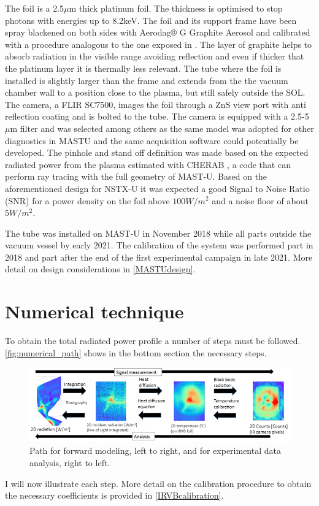 The foil is a 2.5$\mu$m thick platinum foil. The thickness is optimised to stop photons with energies up to 8.2keV. \cite{PETERSON2010} The foil and its support frame have been spray blackened on both sides with Aerodag® G Graphite Aerosol and calibrated with a procedure analogous to the one exposed in \cite{Itomi2014}. The layer of graphite helps to absorb radiation in the visible range avoiding reflection and even if thicker that the platinum layer it is thermally less relevant. \cite{VanEden2018} The tube where the foil is installed is slightly larger than the frame and extends from the the vacuum chamber wall to a position close to the plasma, but still safely outside the SOL. The camera, a FLIR SC7500, images the foil through a ZnS view port with anti reflection coating and is bolted to the tube. The camera is equipped with a 2.5-5$\mu$m filter and was selected among others as the same model was adopted for other diagnostics in MASTU and the same acquisition software could potentially be developed.
The pinhole and stand off definition was made based on the expected radiated power from the plasma estimated with CHERAB \cite{C.GiroudA.MeakinsM.CarrA.Baciero2018}\cite{Carr2017}\cite{A.MeakinsCarrM.2017}, a code that can perform ray tracing with the full geometry of MAST-U.  Based on the aforementioned design for NSTX-U it was expected a good Signal to Noise Ratio (SNR) for a power density on the foil above $100W/m^2$ and a noise floor of about $5W/m^2$. \cite{Reinke2018} 

The tube was installed on MAST-U in November 2018 while all parts outside the vacuum vessel by early 2021. The calibration of the system was performed part in 2018 and part after the end of the first experimental campaign in late 2021. More detail on design considerations in \autoref{MASTUdesign}.


\section{Numerical technique}
To obtain the total radiated power profile a number of steps must be followed. \autoref{fig:numerical_path} shows in the bottom section the necessary steps.

\begin{figure}
	\centering
	\includegraphics[width=\linewidth]{Chapters/chapter2/figs/numerical_path.png}
	\caption{Path for forward modeling, left to right, and for experimental data analysis, right to left.}
	\label{fig:numerical_path}
\end{figure}
I will now illustrate each step. More detail on the calibration procedure to obtain the necessary coefficients is provided in \autoref{IRVBcalibration}.

